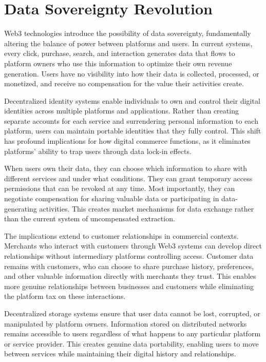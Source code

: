 \documentclass[
  Letterpaper,
]{scrbook}
\begin{document}
\section{Data Sovereignty Revolution}\label{data-sovereignty-revolution}

Web3 technologies introduce the possibility of data sovereignty,
fundamentally altering the balance of power between platforms and users.
In current systems, every click, purchase, search, and interaction
generates data that flows to platform owners who use this information to
optimize their own revenue generation. Users have no visibility into how
their data is collected, processed, or monetized, and receive no
compensation for the value their activities create.

Decentralized identity systems enable individuals to own and control
their digital identities across multiple platforms and applications.
Rather than creating separate accounts for each service and surrendering
personal information to each platform, users can maintain portable
identities that they fully control. This shift has profound implications
for how digital commerce functions, as it eliminates platforms' ability
to trap users through data lock-in effects.

When users own their data, they can choose which information to share
with different services and under what conditions. They can grant
temporary access permissions that can be revoked at any time. Most
importantly, they can negotiate compensation for sharing valuable data
or participating in data-generating activities. This creates market
mechanisms for data exchange rather than the current system of
uncompensated extraction.

The implications extend to customer relationships in commercial
contexts. Merchants who interact with customers through Web3 systems can
develop direct relationships without intermediary platforms controlling
access. Customer data remains with customers, who can choose to share
purchase history, preferences, and other valuable information directly
with merchants they trust. This enables more genuine relationships
between businesses and customers while eliminating the platform tax on
these interactions.

Decentralized storage systems ensure that user data cannot be lost,
corrupted, or manipulated by platform owners. Information stored on
distributed networks remains accessible to users regardless of what
happens to any particular platform or service provider. This creates
genuine data portability, enabling users to move between services while
maintaining their digital history and relationships.
\end{document}
